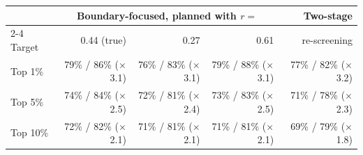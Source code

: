 \begin{tabular}{lrrrr}
\toprule
 & \multicolumn{3}{c}{Boundary-focused, planned with $r=$} & Two-stage \\
\cmidrule(lr){2-4}
Target & 0.44 (true) & 0.27 & 0.61 & re-screening \\
\midrule
Top 1\% & 79\% / 86\% ($\times$3.1) & 76\% / 83\% ($\times$3.1) & 79\% / 88\% ($\times$3.1) & 77\% / 82\% ($\times$3.2) \\
Top 5\% & 74\% / 84\% ($\times$2.5) & 72\% / 81\% ($\times$2.4) & 73\% / 83\% ($\times$2.5) & 71\% / 78\% ($\times$2.3) \\
Top 10\% & 72\% / 82\% ($\times$2.1) & 71\% / 81\% ($\times$2.1) & 71\% / 81\% ($\times$2.1) & 69\% / 79\% ($\times$1.8) \\
\bottomrule
\end{tabular}
